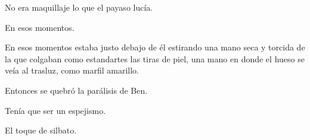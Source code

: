 \sk
No era maquillaje lo que el payaso lucía.

\sk
En esos momentos.

\sk
En esos momentos
estaba justo debajo de él estirando una mano seca
y torcida de la que colgaban como estandartes las
tiras de piel, una mano en donde el hueso se veía
al trasluz, como marfil amarillo.

\sk
Entonces se quebró la parálisis de Ben.

\sk
Tenía que ser un espejismo.

\sk
El toque de silbato.

\sk
\nb{}

\sk
\nb{}

\sk
\nb{}

\sk
\nb{}

\sk
\nb{}

\sk
\nb{}

\sk
\nb{}

\sk
\nb{}

\sk
\nb{}

\sk
\nb{}

\sk
\nb{}

\sk
\nb{}

\sk
\nb{}

\sk
\nb{}

\sk
\nb{}

\sk
\nb{}

\sk
\nb{}

\sk
\nb{}


